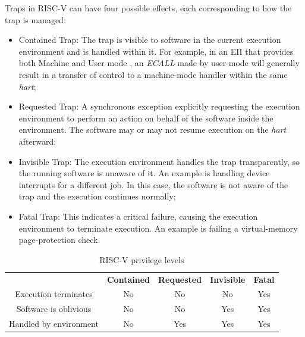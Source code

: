 Traps in RISC-V can have four possible effects, each corresponding to how the
trap is managed:

\begin{itemize}
  \item Contained Trap: The trap is visible to software in the current execution
    environment and is handled within it. For example, in an EII that provides
    both Machine and User mode , an \textit{ECALL} made by user-mode will generally
    result in a transfer of control to a machine-mode handler within the same \textit{hart};

  \item Requested Trap: A synchronous exception explicitly requesting the
    execution environment to perform an action on behalf of the software inside
    the environment. The software may or may not resume execution on the \textit{hart}
    afterward;

  \item Invisible Trap: The execution environment handles the trap transparently,
    so the running software is unaware of it. An example is handling device
    interrupts for a different job. In this case, the software is not aware of
    the trap and the execution continues normally;

  \item Fatal Trap: This indicates a critical failure, causing the execution environment
    to terminate execution. An example is failing a virtual-memory page-protection
    check.
\end{itemize}

\begin{table}
  \centering
  \begin{tabular}{|c|c|c|c|c|}
    \hline
    \textbf{}                           & \textbf{Contained} & \textbf{Requested} & \textbf{Invisible} & \textbf{Fatal} \\
    \hhline{=====} Execution terminates & No                 & No                 & No                 & Yes            \\
    \hline
    Software is oblivious               & No                 & No                 & Yes                & Yes            \\
    \hline
    Handled by environment              & No                 & Yes                & Yes                & Yes            \\
    \hline
  \end{tabular}
  \caption{RISC-V privilege levels}
  \label{tab:traps}
\end{table}

